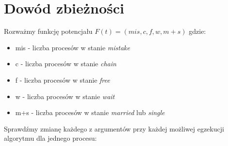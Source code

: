 \documentclass{article}
\begin{document}
\section{Dowód zbieżności}
    Rozważmy funkcję potencjału $F(t) = (mis,c,f,w,m+s)$ gdzie:
    \begin{itemize}
        \item mis - liczba procesów w stanie \textit{mistake}
        \item c - liczba procesów w stanie \textit{chain}
        \item f - liczba procesów w stanie \textit{free}
        \item w - liczba procesów w stanie \textit{wait}
        \item m+s - liczba procesów w stanie \textit{married} lub \textit{single}
    \end{itemize}
    Sprawdźmy zmianę każdego z argumentów przy każdej możliwej egzekucji algorytmu dla jednego procesu:
\end{document}
